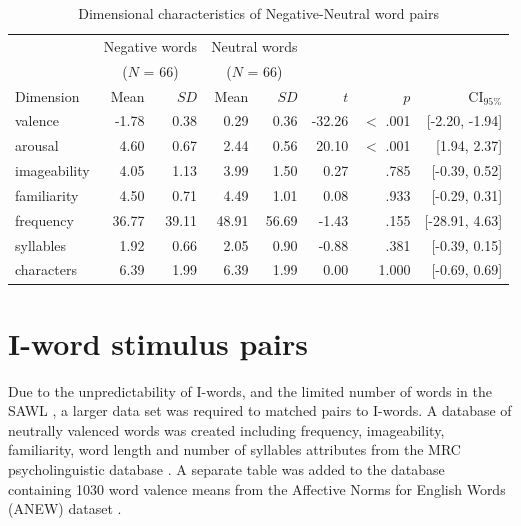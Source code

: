 \documentclass[man,floatsintext,a4paper,biblatex]{apa6}\usepackage[]{graphicx}\usepackage[]{color}
\begin{document}
\begin{table}[ht]
\centering
\caption{Dimensional characteristics of Negative-Neutral word pairs} 
\label{tab:nwordcharacteristics}
{\footnotesize
\begin{tabular}{lrrrrrrr}
  \toprule 
 &  \multicolumn{2}{l}{Negative words}  &  \multicolumn{2}{l}{Neutral words} \\
 &  \multicolumn{2}{c}{(${N}$ = 66)}  &  \multicolumn{2}{c}{(${N}$ = 66)} \\
 \cline{2-5} 
 Dimension & Mean & ${SD}$ & Mean & ${SD}$ & ${t}$ & ${p}$ & CI$_{95\%}$\\
 \midrule 
 valence & -1.78 & 0.38 & 0.29 & 0.36 & -32.26 & $<$ .001 & [-2.20, -1.94] \\ 
  arousal & 4.60 & 0.67 & 2.44 & 0.56 & 20.10 & $<$ .001 & [1.94, 2.37] \\ 
  imageability & 4.05 & 1.13 & 3.99 & 1.50 & 0.27 & .785 & [-0.39, 0.52] \\ 
  familiarity & 4.50 & 0.71 & 4.49 & 1.01 & 0.08 & .933 & [-0.29, 0.31] \\ 
  frequency & 36.77 & 39.11 & 48.91 & 56.69 & -1.43 & .155 & [-28.91, 4.63] \\ 
  syllables & 1.92 & 0.66 & 2.05 & 0.90 & -0.88 & .381 & [-0.39, 0.15] \\ 
  characters & 6.39 & 1.99 & 6.39 & 1.99 & 0.00 & 1.000 & [-0.69, 0.69] \\ 
   \bottomrule 
\end{tabular}
}
\end{table}


\section{I-word stimulus pairs}
\label{app:iwords}

Due to the unpredictability of I-words, and the limited number of words
in the SAWL \parencite{citron_how_2014}, a larger data set was required
to matched pairs to I-words. A database of neutrally valenced words was
created including frequency, imageability, familiarity, word length and
number of syllables attributes from the MRC psycholinguistic database
\parencite{wilson_mrc_1988}. A separate table was added to the database
containing 1030 word valence means from the Affective Norms for English
Words (ANEW) dataset \parencite{bradley_affective_1999}.
\end{document}
